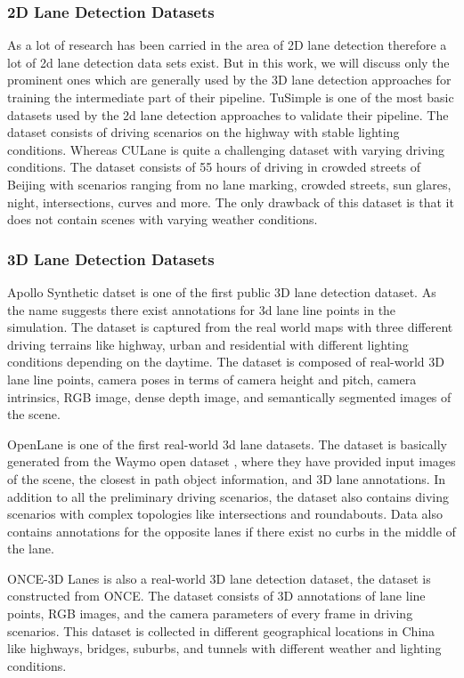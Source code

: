 \subsubsection{2D Lane Detection Datasets}
As a lot of research has been carried in the area of 2D lane detection therefore a lot of 2d lane detection data sets exist. But in this work, we will discuss only the prominent ones which are generally used by the 3D lane detection approaches for training the intermediate part of their pipeline. \cite{Tusimple} TuSimple is one of the most basic datasets used by the 2d lane detection approaches to validate their pipeline. The dataset consists of driving scenarios on the highway with stable lighting conditions. Whereas CULane \cite{pan2018SCNN} is quite a challenging dataset with varying driving conditions. The dataset consists of 55 hours of driving in crowded streets of Beijing with scenarios ranging from no lane marking, crowded streets, sun glares, night, intersections, curves and more. The only drawback of this dataset is that it does not contain scenes with varying weather conditions.

\subsubsection{3D Lane Detection Datasets}
Apollo Synthetic datset\cite{guo2020gen} is one of the first public 3D lane detection dataset. As the name suggests there exist annotations for 3d lane line points in the simulation. The dataset is captured from the real world maps with three different driving terrains like highway, urban and residential with different lighting conditions depending on the daytime. The dataset is composed of real-world 3D lane line points, camera poses in terms of camera height and pitch, camera intrinsics, RGB image, dense depth image, and semantically segmented images of the scene.

OpenLane \cite{chen2022persformer} is one of the first real-world 3d lane datasets. The dataset is basically generated from the Waymo open dataset \cite{Sun_2020_CVPR}, where they have provided input images of the scene, the closest in path object information, and 3D lane annotations. In addition to all the preliminary driving scenarios, the dataset also contains diving scenarios with complex topologies like intersections and roundabouts. Data also contains annotations for the opposite lanes if there exist no curbs in the middle of the lane. 

ONCE-3D Lanes \cite{yan2022once} is also a real-world 3D lane detection dataset, the dataset is constructed from ONCE\cite{mao2021one}. The dataset consists of 3D annotations of lane line points, RGB images, and the camera parameters of every frame in driving scenarios. This dataset is collected in different geographical locations in China like highways, bridges, suburbs, and tunnels with different weather and lighting conditions.


